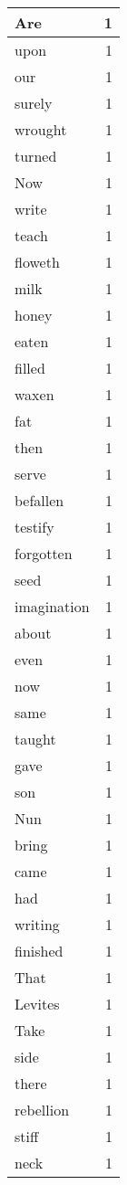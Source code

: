 \begin{center}
\begin{longtable}{l|r}
Are & 1 \\ \hline
upon & 1 \\ \hline
our & 1 \\ \hline
surely & 1 \\ \hline
wrought & 1 \\ \hline
turned & 1 \\ \hline
Now & 1 \\ \hline
write & 1 \\ \hline
teach & 1 \\ \hline
floweth & 1 \\ \hline
milk & 1 \\ \hline
honey & 1 \\ \hline
eaten & 1 \\ \hline
filled & 1 \\ \hline
waxen & 1 \\ \hline
fat & 1 \\ \hline
then & 1 \\ \hline
serve & 1 \\ \hline
befallen & 1 \\ \hline
testify & 1 \\ \hline
forgotten & 1 \\ \hline
seed & 1 \\ \hline
imagination & 1 \\ \hline
about & 1 \\ \hline
even & 1 \\ \hline
now & 1 \\ \hline
same & 1 \\ \hline
taught & 1 \\ \hline
gave & 1 \\ \hline
son & 1 \\ \hline
Nun & 1 \\ \hline
bring & 1 \\ \hline
came & 1 \\ \hline
had & 1 \\ \hline
writing & 1 \\ \hline
finished & 1 \\ \hline
That & 1 \\ \hline
Levites & 1 \\ \hline
Take & 1 \\ \hline
side & 1 \\ \hline
there & 1 \\ \hline
rebellion & 1 \\ \hline
stiff & 1 \\ \hline
neck & 1 \\ \hline

\end{longtable}
\end{center}
